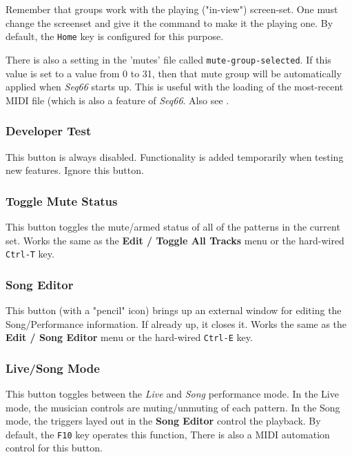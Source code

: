    Remember that groups work with the playing ("in-view") screen-set.
   One must change the screenset and give it the command to make it the
   playing one.
   By default, the \texttt{Home} key is configured for this purpose.

   There is also a setting in the 'mutes' file called
   \texttt{mute-group-selected}.  If this value is set to a value from 0 to 31,
   then that mute group will be automatically applied when
   \textsl{Seq66} starts up.
   This is useful with the loading of the most-recent MIDI file (which is also
   a feature of \textsl{Seq66}.
   Also see .

\subsubsection{Developer Test}
\label{subsubsec:introduction_developer_test_button}

   This button is always disabled.  Functionality is added temporarily when
   testing new features. Ignore this button.

\subsubsection{Toggle Mute Status}
\label{subsubsec:introduction_toggle_mute_status_button}

   This button toggles the mute/armed status of all of the patterns
   in the current set.
   Works the same as the
   \textbf{Edit / Toggle All Tracks} menu or the hard-wired
   \texttt{Ctrl-T} key.

\subsubsection{Song Editor}
\label{subsubsec:introduction_song_editor_button}

   This button (with a "pencil" icon)
   brings up an external window for editing the Song/Performance
   information.  If already up, it closes it.
   Works the same as the
   \textbf{Edit / Song Editor} menu or the hard-wired \texttt{Ctrl-E} key.

\subsubsection{Live/Song Mode}
\label{subsubsec:introduction_livesong_mode_button}

   This button toggles between the \textsl{Live} and \textsl{Song} performance
   mode. In the Live mode, the musician controls are muting/unmuting of each
   pattern.  In the Song mode, the triggers layed out in the
   \textbf{Song Editor} control the playback.
   By default, the \texttt{F10} key operates this function,
   There is also a MIDI automation control for this button.

